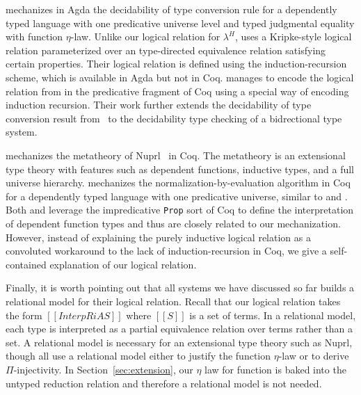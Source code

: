 \documentclass[acmsmall,screen=true,
\ifpublic review=false\else,review=true\fi
  ,anonymous=\ifanonymous true\else false\fi]{acmart}
\newcommand{\lang}{$\lambda^H$\xspace}
\newcommand{\scw}[1]{}
\begin{document}
\citet{decagda} mechanizes in Agda the decidability of type
conversion rule for a dependently typed language with one predicative
universe level and typed judgmental equality with function
$\eta$-law. Unlike our logical relation for \lang{}, \citet{decagda}
uses a Kripke-style logical relation parameterized over an
type-directed equivalence relation satisfying certain
properties. Their logical relation is defined using the
induction-recursion scheme, which is available in Agda but not in Coq.
\citet{martin-lof-a-la-coq} manages to encode the logical relation
from \citet{decagda} in the predicative fragment of Coq using a
special way of encoding induction recursion. Their work further
extends the decidability of type conversion result from~\citet{decagda} to the decidability
type checking of a bidrectional type system.

\citet{anand2014towards} mechanizes the metatheory of
Nuprl~\citep{constable1986implementing} in Coq. The metatheory is an
extensional type theory with features such as dependent functions,
inductive types, and a full universe hierarchy. \citet{nbeincoq}
mechanizes the normalization-by-evaluation algorithm in Coq for a
dependently typed language with one predicative universe, similar to
\citet{decagda} and \citet{martin-lof-a-la-coq}. Both
\citet{anand2014towards} and \citet{nbeincoq} leverage the
impredicative \texttt{Prop} sort of Coq to define the interpretation
of dependent function types and thus are closely related to our
mechanization. However, instead of explaining the purely inductive
logical relation as a convoluted workaround to the lack of
induction-recursion in Coq, we give a self-contained explanation of
our logical relation.

Finally, it is worth pointing out that all systems we have discussed
so far builds a relational model for their logical relation. Recall
that our logical relation takes the form $[[InterpR i A S]]$ where
$[[S]]$ is a set of terms. In a relational model, each type is
interpreted as a partial equivalence relation over terms rather than a
set. A relational model is necessary for an extensional type theory
such as Nuprl, though \citet{nbeincoq,decagda,martin-lof-a-la-coq} all
use a relational model either to justify the function $\eta$-law or to
derive $\Pi$-injectivity. In Section~\ref{sec:extension}, our $\eta$
law for function is baked into the untyped reduction
relation and therefore a relational model is not needed.
\scw{would it be difficult to extend your proof to be a PER?}
\end{document}
